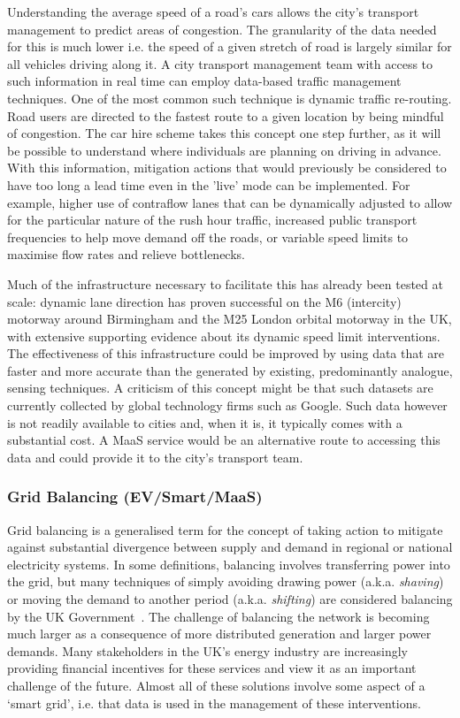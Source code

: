 \documentclass[b5paper,10pt]{article}
\begin{document}
Understanding the average speed of a road's cars allows the city's
transport management to predict areas of congestion. The granularity
of the data needed for this is much lower i.e. the speed of a given
stretch of road is largely similar for all vehicles driving along
it. A city transport management team with access to such information
in real time can employ data-based traffic management techniques. One
of the most common such technique is dynamic traffic re-routing. Road
users are directed to the fastest route to a given location by being
mindful of congestion. The car hire scheme takes this concept one step
further, as it will be possible to understand where individuals are
planning on driving in advance. With this information, mitigation
actions that would previously be considered to have too long a lead
time even in the 'live' mode can be implemented. For example, higher
use of contraflow lanes that can be dynamically adjusted to allow for
the particular nature of the rush hour traffic, increased public
transport frequencies to help move demand off the roads, or variable
speed limits to maximise flow rates and relieve bottlenecks.

Much of the infrastructure necessary to facilitate this has already
been tested at scale: dynamic lane direction has proven successful on
the M6 (intercity) motorway around Birmingham and the M25 London
orbital motorway in the UK, with extensive supporting evidence about
its dynamic speed limit interventions. The effectiveness of this
infrastructure could be improved by using data that are faster and
more accurate than the generated by existing, predominantly analogue,
sensing techniques.  A criticism of this concept might be that such
datasets are currently collected by global technology firms such as
Google. Such data however is not readily available to cities and, when
it is, it typically comes with a substantial cost. A MaaS service
would be an alternative route to accessing this data and could provide
it to the city's transport team.


\subsubsection{Grid Balancing (EV/Smart/MaaS)} 

Grid balancing is a generalised term for the concept of taking action
to mitigate against substantial divergence between supply and demand
in regional or national electricity systems. In some definitions,
balancing involves transferring power into the grid, but many
techniques of simply avoiding drawing power (a.k.a. {\emph{shaving}})
or moving the demand to another period (a.k.a. {\emph{shifting}}) are
considered balancing by the UK Government~\citep{decc:2014}. The
challenge of balancing the network is becoming much larger as a
consequence of more distributed generation and larger power
demands. Many stakeholders in the UK's energy industry are
increasingly providing financial incentives for these services and
view it as an important challenge of the future. Almost all of these
solutions involve some aspect of a `smart grid', i.e. that data is
used in the management of these interventions.
\end{document}
